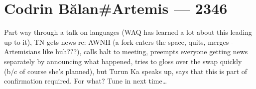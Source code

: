 \hypertarget{codrin-bux103lanartemis-2346}{%
\chapter{Codrin Bălan\#Artemis — 2346}\label{codrin-bux103lanartemis-2346}}

Part way through a talk on languages (WAQ has learned a lot about this leading up to it), TN gets news re: AWNH (a fork enters the space, quits, merges - Artemisians like huh???), calls halt to meeting, preempts everyone getting news separately by announcing what happened, tries to gloss over the swap quickly (b/c of course she's planned), but Turun Ka speaks up, says that this is part of confirmation required. For what? Tune in next time\ldots{}
